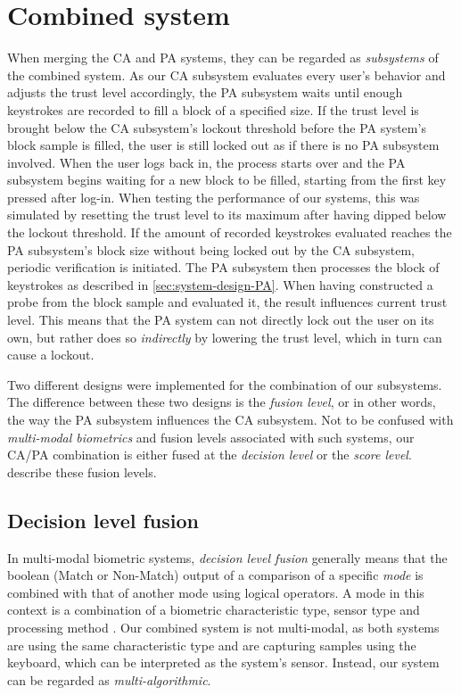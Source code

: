 \section{Combined system}
\label{sec:system-design-combined}
When merging the CA and PA systems, they can be regarded as \textit{subsystems} of the combined system.
As our CA subsystem evaluates every user's behavior and adjusts the trust level accordingly, the PA subsystem waits until enough keystrokes are recorded to fill a block of a specified size.
If the trust level is brought below the CA subsystem's lockout threshold before the PA system's block sample is filled, the user is still locked out as if there is no PA subsystem involved.
When the user logs back in, the process starts over and the PA subsystem begins waiting for a new block to be filled, starting from the first key pressed after log-in.
When testing the performance of our systems, this was simulated by resetting the trust level to its maximum after having dipped below the lockout threshold.
If the amount of recorded keystrokes evaluated reaches the PA subsystem's block size without being locked out by the CA subsystem, periodic verification is initiated.
The PA subsystem then processes the block of keystrokes as described in \cref{sec:system-design-PA}.
When having constructed a probe from the block sample and evaluated it, the result influences current trust level.
This means that the PA system can not directly lock out the user on its own, but rather does so \textit{indirectly} by lowering the trust level, which in turn can cause a lockout.

Two different designs were implemented for the combination of our subsystems.
The difference between these two designs is the \textit{fusion level}, or in other words, the way the PA subsystem influences the CA subsystem.
Not to be confused with \textit{multi-modal biometrics} and fusion levels associated with such systems, our CA/PA combination is either fused at the \textit{decision level} or the \textit{score level}.
 describe these fusion levels.

\subsection{Decision level fusion}
\label{sec:system-design-combined-decision}
In multi-modal biometric systems, \textit{decision level fusion} generally means that the boolean (Match or Non-Match) output of a comparison of a specific \textit{mode} is combined with that of another mode using logical operators.
A mode in this context is a combination of a biometric characteristic type, sensor type and processing method \cite{ISO-voc}.
Our combined system is not multi-modal, as both systems are using the same characteristic type and are capturing samples using the keyboard, which can be interpreted as the system's sensor.
Instead, our system can be regarded as \textit{multi-algorithmic}.

